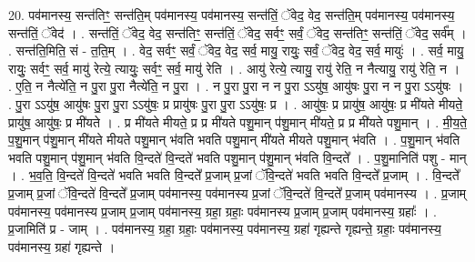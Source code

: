 \documentclass[17pt]{extarticle}
\begin{document}
20. पव॑मानस्य॒ सन्त॑तिꣳ॒॒ सन्त॑ति॒म् पव॑मानस्य॒ पव॑मानस्य॒ सन्त॑तिं॒ ॅवेद॒ वेद॒ सन्त॑ति॒म् पव॑मानस्य॒ पव॑मानस्य॒ सन्त॑तिं॒ ॅवेद॑ । . सन्त॑तिं॒ ॅवेद॒ वेद॒ सन्त॑तिꣳ॒॒ सन्त॑तिं॒ ॅवेद॒ सर्वꣳ॒॒ सर्वं॒ ॅवेद॒ सन्त॑तिꣳ॒॒ सन्त॑तिं॒ ॅवेद॒ सर्व᳚म् । . सन्त॑ति॒मिति॒ सं - त॒ति॒म् । . वेद॒ सर्वꣳ॒॒ सर्वं॒ ॅवेद॒ वेद॒ सर्व॒ मायु॒ रायुः॒ सर्वं॒ ॅवेद॒ वेद॒ सर्व॒ मायुः॑ । . सर्व॒ मायु॒ रायुः॒ सर्वꣳ॒॒ सर्व॒ मायु॑ रेत्ये॒ त्यायुः॒ सर्वꣳ॒॒ सर्व॒ मायु॑ रेति । . आयु॑ रेत्ये॒ त्यायु॒ रायु॑ रेति॒ न नैत्यायु॒ रायु॑ रेति॒ न । . ए॒ति॒ न नैत्ये॑ति॒ न पु॒रा पु॒रा नैत्ये॑ति॒ न पु॒रा । . न पु॒रा पु॒रा न न पु॒रा ऽऽयु॑ष॒ आयु॑षः पु॒रा न न पु॒रा ऽऽयु॑षः । . पु॒रा ऽऽयु॑ष॒ आयु॑षः पु॒रा पु॒रा ऽऽयु॑षः॒ प्र प्रायु॑षः पु॒रा पु॒रा ऽऽयु॑षः॒ प्र । . आयु॑षः॒ प्र प्रायु॑ष॒ आयु॑षः॒ प्र मी॑यते मीयते॒ प्रायु॑ष॒ आयु॑षः॒ प्र मी॑यते । . प्र मी॑यते मीयते॒ प्र प्र मी॑यते पशु॒मान् प॑शु॒मान् मी॑यते॒ प्र प्र मी॑यते पशु॒मान् । . मी॒य॒ते॒ प॒शु॒मान् प॑शु॒मान् मी॑यते मीयते पशु॒मान् भ॑वति भवति पशु॒मान् मी॑यते मीयते पशु॒मान् भ॑वति । . प॒शु॒मान् भ॑वति भवति पशु॒मान् प॑शु॒मान् भ॑वति वि॒न्दते॑ वि॒न्दते॑ भवति पशु॒मान् प॑शु॒मान् भ॑वति वि॒न्दते᳚ । . प॒शु॒मानिति॑ पशु - मान् । . भ॒व॒ति॒ वि॒न्दते॑ वि॒न्दते॑ भवति भवति वि॒न्दते᳚ प्र॒जाम् प्र॒जां ॅवि॒न्दते॑ भवति भवति वि॒न्दते᳚ प्र॒जाम् । . वि॒न्दते᳚ प्र॒जाम् प्र॒जां ॅवि॒न्दते॑ वि॒न्दते᳚ प्र॒जाम् पव॑मानस्य॒ पव॑मानस्य प्र॒जां ॅवि॒न्दते॑ वि॒न्दते᳚ प्र॒जाम् पव॑मानस्य । . प्र॒जाम् पव॑मानस्य॒ पव॑मानस्य प्र॒जाम् प्र॒जाम् पव॑मानस्य॒ ग्रहा॒ ग्रहाः॒ पव॑मानस्य प्र॒जाम् प्र॒जाम् पव॑मानस्य॒ ग्रहाः᳚ । . प्र॒जामिति॑ प्र - जाम् । . पव॑मानस्य॒ ग्रहा॒ ग्रहाः॒ पव॑मानस्य॒ पव॑मानस्य॒ ग्रहा॑ गृह्यन्ते गृह्यन्ते॒ ग्रहाः॒ पव॑मानस्य॒ पव॑मानस्य॒ ग्रहा॑ गृह्यन्ते । \newline
\end{document}
